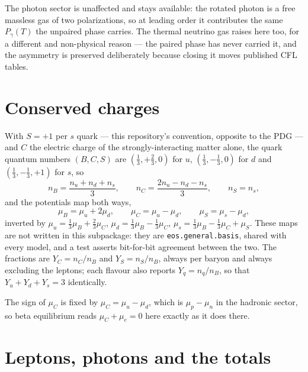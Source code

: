 \documentclass[aps,prc,onecolumn,superscriptaddress,nofootinbib,10pt]{revtex4-2}
\newcommand{\nB}{n_B}
\newcommand{\nC}{n_C}
\newcommand{\nS}{n_S}
\newcommand{\muB}{\mu_B}
\newcommand{\muC}{\mu_C}
\newcommand{\muS}{\mu_S}
\begin{document}
The photon sector is unaffected and stays available: the rotated photon is a
free massless gas of two polarizations, so at leading order it contributes the
same $P_\gamma(T)$ the unpaired phase carries. The thermal neutrino gas raises
here too, for a different and non-physical reason --- the paired phase has
never carried it, and the asymmetry is preserved deliberately because closing
it moves published CFL tables.

\section{Conserved charges}
\label{sec:charges}

With $S = +1$ per $s$ quark --- this repository's convention, opposite to the
PDG --- and $C$ the electric charge of the strongly-interacting matter alone,
the quark quantum numbers $(B, C, S)$ are $(\tfrac13, +\tfrac23, 0)$ for $u$,
$(\tfrac13, -\tfrac13, 0)$ for $d$ and $(\tfrac13, -\tfrac13, +1)$ for $s$, so
%
\begin{equation}
\nB = \frac{n_u + n_d + n_s}{3} , \qquad
\nC = \frac{2 n_u - n_d - n_s}{3} , \qquad
\nS = n_s ,
\label{eq:charges}
\end{equation}
%
and the potentials map both ways,
%
\begin{equation}
\muB = \mu_u + 2\mu_d , \qquad
\muC = \mu_u - \mu_d , \qquad
\muS = \mu_s - \mu_d ,
\label{eq:basis}
\end{equation}
%
inverted by $\mu_u = \tfrac13\muB + \tfrac23\muC$,
$\mu_d = \tfrac13\muB - \tfrac13\muC$,
$\mu_s = \tfrac13\muB - \tfrac13\muC + \muS$. These maps are not written in
this subpackage: they are \texttt{eos.general.basis}, shared with every model,
and a test asserts bit-for-bit agreement between the two. The fractions are
$Y_C = \nC/\nB$ and $Y_S = \nS/\nB$, always per baryon and always excluding
the leptons; each flavour also reports $Y_q = n_q/\nB$, so that
$Y_u + Y_d + Y_s = 3$ identically.

The sign of $\muC$ is fixed by $\muC = \mu_u - \mu_d$, which is
$\mu_p - \mu_n$ in the hadronic sector, so beta equilibrium reads
$\muC + \mu_e = 0$ here exactly as it does there.

\section{Leptons, photons and the totals}
\label{sec:totals}
\end{document}
